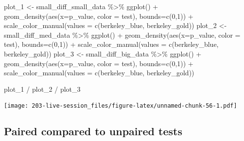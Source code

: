 \documentclass[
]{book}
\newenvironment{Shaded}{\begin{snugshade}}{\end{snugshade}}
\newcommand{\AttributeTok}[1]{\textcolor[rgb]{0.77,0.63,0.00}{#1}}
\newcommand{\DecValTok}[1]{\textcolor[rgb]{0.00,0.00,0.81}{#1}}
\newcommand{\FunctionTok}[1]{\textcolor[rgb]{0.00,0.00,0.00}{#1}}
\newcommand{\NormalTok}[1]{#1}
\newcommand{\OtherTok}[1]{\textcolor[rgb]{0.56,0.35,0.01}{#1}}
\newcommand{\SpecialCharTok}[1]{\textcolor[rgb]{0.00,0.00,0.00}{#1}}
\theoremstyle{definition}
\theoremstyle{definition}
\theoremstyle{definition}
\theoremstyle{definition}
\theoremstyle{remark}
\begin{document}
\begin{Shaded}
\begin{Highlighting}[]
\NormalTok{plot\_1 }\OtherTok{\textless{}{-}}\NormalTok{ small\_diff\_small\_data }\SpecialCharTok{\%\textgreater{}\%}
  \FunctionTok{ggplot}\NormalTok{() }\SpecialCharTok{+}
  \FunctionTok{geom\_density}\NormalTok{(}\FunctionTok{aes}\NormalTok{(}\AttributeTok{x=}\NormalTok{p\_value, }\AttributeTok{color =}\NormalTok{ test), }\AttributeTok{bounds=}\FunctionTok{c}\NormalTok{(}\DecValTok{0}\NormalTok{,}\DecValTok{1}\NormalTok{)) }\SpecialCharTok{+}
  \FunctionTok{scale\_color\_manual}\NormalTok{(}\AttributeTok{values =} \FunctionTok{c}\NormalTok{(berkeley\_blue, berkeley\_gold))}
\NormalTok{plot\_2 }\OtherTok{\textless{}{-}}\NormalTok{ small\_diff\_med\_data }\SpecialCharTok{\%\textgreater{}\%}
  \FunctionTok{ggplot}\NormalTok{() }\SpecialCharTok{+}
  \FunctionTok{geom\_density}\NormalTok{(}\FunctionTok{aes}\NormalTok{(}\AttributeTok{x=}\NormalTok{p\_value, }\AttributeTok{color =}\NormalTok{ test), }\AttributeTok{bounds=}\FunctionTok{c}\NormalTok{(}\DecValTok{0}\NormalTok{,}\DecValTok{1}\NormalTok{)) }\SpecialCharTok{+}
  \FunctionTok{scale\_color\_manual}\NormalTok{(}\AttributeTok{values =} \FunctionTok{c}\NormalTok{(berkeley\_blue, berkeley\_gold))}
\NormalTok{plot\_3 }\OtherTok{\textless{}{-}}\NormalTok{ small\_diff\_big\_data }\SpecialCharTok{\%\textgreater{}\%}
  \FunctionTok{ggplot}\NormalTok{() }\SpecialCharTok{+}
  \FunctionTok{geom\_density}\NormalTok{(}\FunctionTok{aes}\NormalTok{(}\AttributeTok{x=}\NormalTok{p\_value, }\AttributeTok{color =}\NormalTok{ test), }\AttributeTok{bounds=}\FunctionTok{c}\NormalTok{(}\DecValTok{0}\NormalTok{,}\DecValTok{1}\NormalTok{)) }\SpecialCharTok{+}
  \FunctionTok{scale\_color\_manual}\NormalTok{(}\AttributeTok{values =} \FunctionTok{c}\NormalTok{(berkeley\_blue, berkeley\_gold))}

\NormalTok{plot\_1 }\SpecialCharTok{/}\NormalTok{ plot\_2 }\SpecialCharTok{/}\NormalTok{ plot\_3}
\end{Highlighting}
\end{Shaded}

\texttt{[image: 203-live-session\_files/figure-latex/unnamed-chunk-56-1.pdf]}

\hypertarget{paired-compared-to-unpaired-tests}{%
\subsection{Paired compared to unpaired tests}\label{paired-compared-to-unpaired-tests}}
\end{document}
